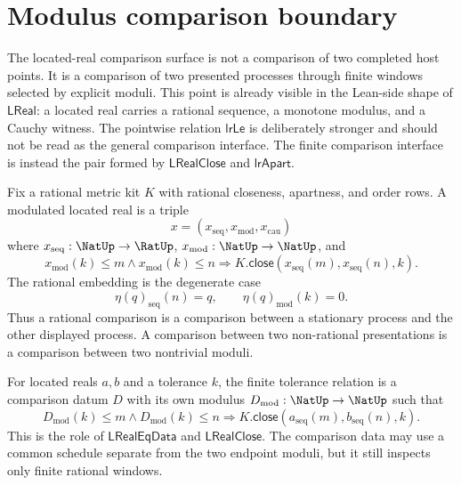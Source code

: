 \section{Modulus comparison boundary}
\label{sec:real-completeness-modulus-comparison-boundary}

The located-real comparison surface is not a comparison of two completed
host points.  It is a comparison of two presented processes through finite
windows selected by explicit moduli.  This point is already visible in the
Lean-side shape of $\mathsf{LReal}$: a located real carries a rational
sequence, a monotone modulus, and a Cauchy witness.  The pointwise relation
$\mathsf{lrLe}$ is deliberately stronger and should not be read as the
general comparison interface.  The finite comparison interface is instead
the pair formed by $\mathsf{LRealClose}$ and $\mathsf{lrApart}$.

\begin{definition}
\label{def:real-completeness-modulated-located-real}
Fix a rational metric kit $K$ with rational closeness, apartness, and order
rows.  A modulated located real is a triple
$$
x=(x_{\mathrm{seq}},x_{\mathrm{mod}},x_{\mathrm{cau}})
$$
where $x_{\mathrm{seq}}:\NatUp\to\RatUp$,
$x_{\mathrm{mod}}:\NatUp\to\NatUp$, and
$$
x_{\mathrm{mod}}(k)\le m\wedge x_{\mathrm{mod}}(k)\le n
\Longrightarrow
K.\mathsf{close}(x_{\mathrm{seq}}(m),x_{\mathrm{seq}}(n),k).
$$
The rational embedding is the degenerate case
$$
\eta(q)_{\mathrm{seq}}(n)=q,
\qquad
\eta(q)_{\mathrm{mod}}(k)=0.
$$
Thus a rational comparison is a comparison between a stationary process and
the other displayed process.  A comparison between two non-rational
presentations is a comparison between two nontrivial moduli.
\end{definition}

\begin{definition}
\label{def:real-completeness-finite-tolerance-comparison}
For located reals $a,b$ and a tolerance $k$, the finite tolerance relation
is a comparison datum $D$ with its own modulus
$D_{\mathrm{mod}}:\NatUp\to\NatUp$ such that
$$
D_{\mathrm{mod}}(k)\le m\wedge D_{\mathrm{mod}}(k)\le n
\Longrightarrow
K.\mathsf{close}(a_{\mathrm{seq}}(m),b_{\mathrm{seq}}(n),k).
$$
This is the role of $\mathsf{LRealEqData}$ and
$\mathsf{LRealClose}$.  The comparison data may use a common schedule
separate from the two endpoint moduli, but it still inspects only finite
rational windows.
\end{definition}

